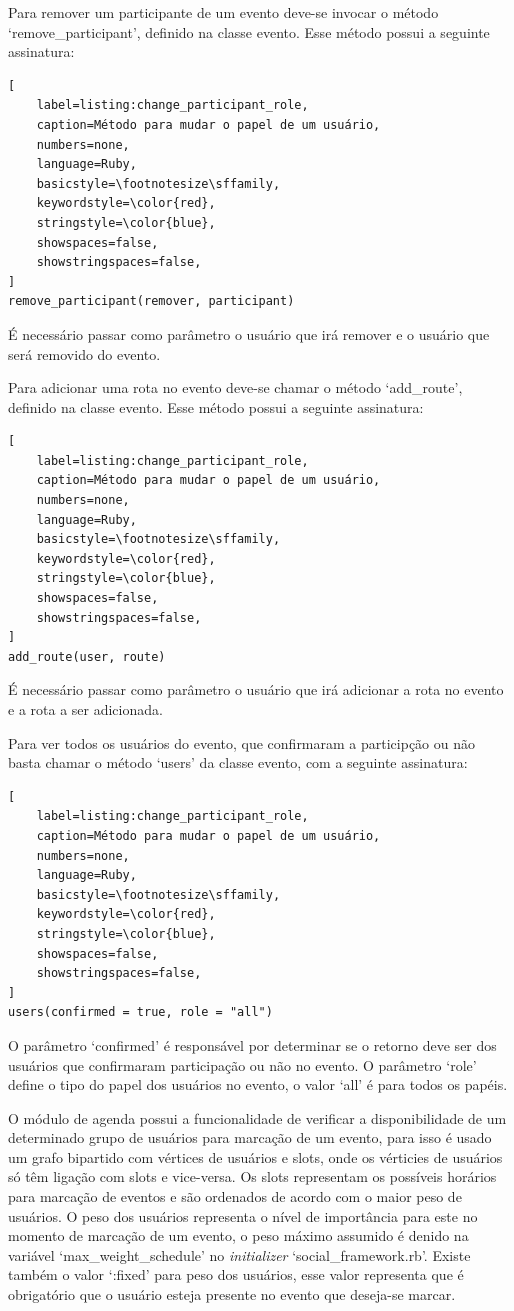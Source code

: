 Para remover um participante de um evento deve-se invocar o método `remove\_participant', definido na classe evento. Esse método possui a seguinte assinatura:

\begin{lstlisting}[
    label=listing:change_participant_role,
    caption=Método para mudar o papel de um usuário,
    numbers=none,
    language=Ruby,
    basicstyle=\footnotesize\sffamily,
    keywordstyle=\color{red},
    stringstyle=\color{blue},
    showspaces=false,
    showstringspaces=false,
]
remove_participant(remover, participant)
\end{lstlisting}

É necessário passar como parâmetro o usuário que irá remover e o usuário que será removido do evento.

Para adicionar uma rota no evento deve-se chamar o método `add\_route', definido na classe evento. Esse método possui a seguinte assinatura:

\begin{lstlisting}[
    label=listing:change_participant_role,
    caption=Método para mudar o papel de um usuário,
    numbers=none,
    language=Ruby,
    basicstyle=\footnotesize\sffamily,
    keywordstyle=\color{red},
    stringstyle=\color{blue},
    showspaces=false,
    showstringspaces=false,
]
add_route(user, route)
\end{lstlisting}

É necessário passar como parâmetro o usuário que irá adicionar a rota no evento e a rota a ser adicionada.

Para ver todos os usuários do evento, que confirmaram a participção ou não basta chamar o método `users' da classe evento, com a seguinte assinatura:

\begin{lstlisting}[
    label=listing:change_participant_role,
    caption=Método para mudar o papel de um usuário,
    numbers=none,
    language=Ruby,
    basicstyle=\footnotesize\sffamily,
    keywordstyle=\color{red},
    stringstyle=\color{blue},
    showspaces=false,
    showstringspaces=false,
]
users(confirmed = true, role = "all")
\end{lstlisting}

O parâmetro `confirmed' é responsável por determinar se o retorno deve ser dos usuários que confirmaram participação ou não no evento. O parâmetro `role' define o tipo do papel dos usuários no evento, o valor `all' é para todos os papéis.

O módulo de agenda possui a funcionalidade de verificar a disponibilidade de um determinado grupo de usuários para marcação de um evento, para isso é usado um grafo bipartido com vértices de usuários e slots, onde os vérticies de usuários só têm ligação com slots e vice-versa. Os slots representam os possíveis horários para marcação de eventos e são ordenados de acordo com o maior peso de usuários. O peso dos usuários representa o nível de importância para este no momento de marcação de um evento, o peso máximo assumido é denido na variável `max\_weight\_schedule' no \textit{initializer} `social\_framework.rb'. Existe também o valor `:fixed' para peso dos usuários, esse valor representa que é obrigatório que o usuário esteja presente no evento que deseja-se marcar.

